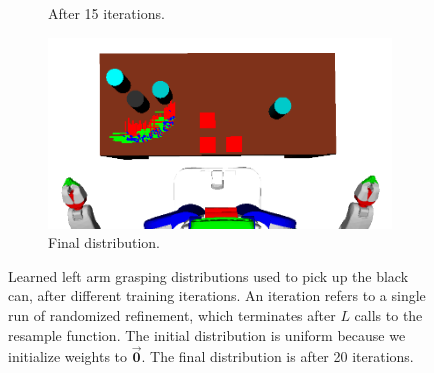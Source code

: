 \begin{figure}
\begin{subfigure}[b]{0.48\linewidth}
    \caption{After 15 iterations.}
  \end{subfigure}
  \begin{subfigure}[b]{0.48\linewidth}
    \includegraphics[width=\textwidth]{images/learng20.png}
    \caption{Final distribution.}
  \end{subfigure}
  \caption{Learned left arm grasping distributions used to
pick up the black can, after different training iterations.
An iteration refers to a single run of randomized refinement,
which terminates after $L$ calls to the resample function. The
initial distribution is uniform because we initialize weights to $\vec{\mathbf{0}}$.
The final distribution is after 20 iterations.}
  \label{fig:training}
\end{figure}

